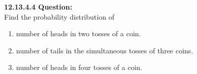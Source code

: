 \documentclass[journal,12pt,onecolumn]{IEEEtran}
\begin{document}
%
\textbf{12.13.4.4  Question:} 
\\Find the probability distribution of
\begin{enumerate}[label=(\roman*)]
\item number of heads in two tosses of a coin.\item number of tails in the simultaneous tosses of three coins. \item number of heads in four tosses of a coin. \\
\end{enumerate}
\end{document}
